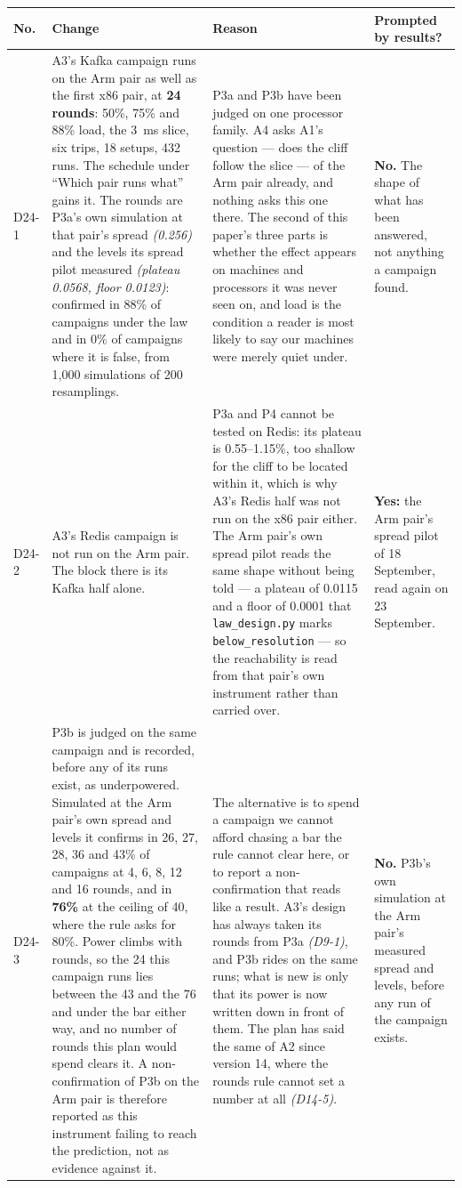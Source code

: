 \documentclass[11pt]{article}
\newcommand{\gl}[1]{{\color{soft}\itshape\small (#1)}}
\begin{document}
{\small
\begin{longtable}{@{}p{1.1cm} >{\raggedright\arraybackslash}p{6.1cm} >{\raggedright\arraybackslash}p{6.0cm} >{\raggedright\arraybackslash}p{2.2cm}@{}}
\toprule
\textbf{No.} & \textbf{Change} & \textbf{Reason} & \textbf{Prompted by results?} \\
\midrule
\endhead
D24-1 & A3's Kafka campaign runs on the Arm pair as well as the first x86 pair, at
\textbf{24 rounds}: 50\%, 75\% and 88\% load, the 3~ms slice, six trips, 18 setups, 432 runs. The
schedule under ``Which pair runs what'' gains it. The rounds are P3a's own simulation at that
pair's spread \gl{0.256} and the levels its spread pilot measured \gl{plateau 0.0568, floor
0.0123}: confirmed in 88\% of campaigns under the law and in 0\% of campaigns where it is false,
from 1,000 simulations of 200 resamplings. & P3a and P3b have been judged on one processor family.
A4 asks A1's question --- does the cliff follow the slice --- of the Arm pair already, and nothing
asks this one there. The second of this paper's three parts is whether the effect appears on
machines and processors it was never seen on, and load is the condition a reader is most likely to
say our machines were merely quiet under. & \textbf{No.} The shape of what has been answered, not
anything a campaign found. \\
D24-2 & A3's Redis campaign is not run on the Arm pair. The block there is its Kafka half alone.
& P3a and P4 cannot be tested on Redis: its plateau is 0.55--1.15\%, too shallow for the cliff to
be located within it, which is why A3's Redis half was not run on the x86 pair either. The Arm
pair's own spread pilot reads the same shape without being told --- a plateau of 0.0115 and a
floor of 0.0001 that \texttt{law\_design.py} marks \texttt{below\_resolution} --- so the
reachability is read from that pair's own instrument rather than carried over. & \textbf{Yes:}
the Arm pair's spread pilot of 18 September, read again on 23 September. \\
D24-3 & P3b is judged on the same campaign and is recorded, before any of its runs exist, as
underpowered. Simulated at the Arm pair's own spread and levels it confirms in 26, 27, 28, 36 and
43\% of campaigns at 4, 6, 8, 12 and 16 rounds, and in \textbf{76\%} at the ceiling of 40, where
the rule asks for 80\%. Power climbs with rounds, so the 24 this campaign runs lies between the
43 and the 76 and under the bar either way, and no number of rounds this plan would spend clears
it. A non-confirmation of P3b on the Arm pair is therefore reported as this instrument failing to
reach the prediction, not as evidence against it. & The alternative is
to spend a campaign we cannot afford chasing a bar the rule cannot clear here, or to report a
non-confirmation that reads like a result. A3's design has always taken its rounds from P3a
\gl{D9-1}, and P3b rides on the same runs; what is new is only that its power is now written down
in front of them. The plan has said the same of A2 since version 14, where the rounds rule cannot
set a number at all \gl{D14-5}. & \textbf{No.} P3b's own simulation at the Arm pair's measured
spread and levels, before any run of the campaign exists. \\
\bottomrule
\end{longtable}}
\end{document}
